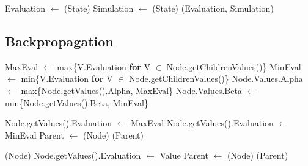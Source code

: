 \begin{algorithm}[H]
    \begin{algorithmic}[1]
            \State Evaluation $\gets$ (State)
            \State Simulation $\gets$ (State)
            \State \Return (Evaluation, Simulation)
        \EndProcedure
    \end{algorithmic}    
\end{algorithm}

\newpage
\subsection*{Backpropagation}
\begin{algorithm}[H]
    \begin{algorithmic}[1]
                \State MaxEval $\gets$ max\{V.Evaluation \textbf{for} V $\in$ Node.getChildrenValues()\}
                \State MinEval $\gets$ min\{V.Evaluation \textbf{for} V $\in$ Node.getChildrenValues()\}
                    \State Node.Values.Alpha $\gets$ max\{Node.getValues().Alpha, MaxEval\}
                \Else
                    \State Node.Values.Beta $\gets$ min\{Node.getValues().Beta, MinEval\}
                \EndIf
                
                        \State Node.getValues().Evaluation $\gets$ MaxEval
                    \Else
                        \State Node.getValues().Evaluation $\gets$ MinEval
                    \EndIf
                    \State Parent $\gets$ (Node)
                        (Parent)
                    \EndIf                    
                \EndIf

            \EndProcedure
                \State {}(Node)
            \Else
                \State Node.getValues().Evaluation $\gets$ Value
                \State Parent $\gets$ (Node)
                    (Parent)
                \EndIf
            \EndIf
        \EndProcedure
    \end{algorithmic}    
\end{algorithm}

